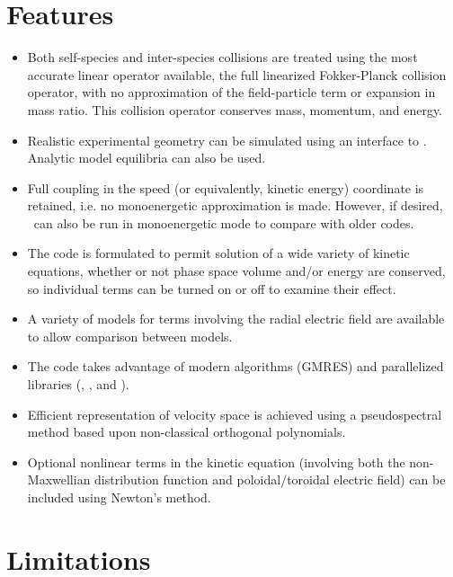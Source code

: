 \section{Features}

\begin{itemize}

\item
Both self-species and inter-species collisions are treated using the most accurate linear operator available, the full linearized Fokker-Planck collision operator,
with no approximation of the field-particle term or expansion in mass ratio.  This collision operator conserves mass, momentum, and energy.

\item
Realistic experimental geometry can be simulated using an interface to \vmec.  Analytic model equilibria can also be used.

\item
Full coupling in the speed (or equivalently, kinetic energy) coordinate is retained, i.e. no monoenergetic approximation is made.  However,
if desired, \sfincs~can also be run in monoenergetic mode to compare with older codes.

\item
The code is formulated to permit solution of a wide variety of kinetic equations, whether or not phase space volume and/or energy are conserved, so individual terms can be turned on or off to examine their effect. 

\item
A variety of models for terms involving the radial electric field are available to allow comparison between models. 

\item
The code takes advantage of modern algorithms (GMRES) and parallelized libraries (\PETSc, \superludist, and \mumps).

\item
Efficient representation of velocity space is achieved using a pseudospectral method based upon non-classical orthogonal polynomials. \cite{speedGrids}

\item
Optional nonlinear terms in the kinetic equation (involving both the non-Maxwellian distribution function and poloidal/toroidal electric field) can be included using Newton's method. 

\end{itemize}

\section{Limitations}

